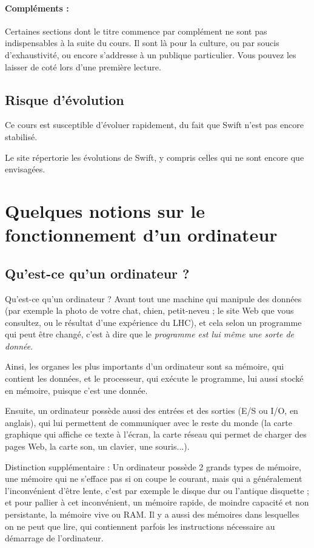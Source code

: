 \paragraph{Compléments :}
Certaines sections dont le titre commence par complément
ne sont pas indispensables à la suite du cours.
Il sont là pour la culture, ou par soucis d'exhaustivité,
ou encore s'addresse à un publique particulier.
Vous pouvez les laisser de coté lors d'une première lecture.
\subsection{Risque d’évolution}
Ce cours est susceptible d'évoluer rapidement,
du fait que Swift n'est pas encore stabilisé.

Le site
répertorie les évolutions de Swift,
y compris celles qui ne sont encore que envisagées.
\section{Quelques notions sur le fonctionnement d'un ordinateur}
\subsection{Qu'est-ce qu'un ordinateur ?}
Qu'est-ce qu'un ordinateur ?
Avant tout une machine qui manipule des données
(par exemple la photo de votre chat, chien, petit-neveu ;
le site Web que vous consultez, ou le résultat d'une expérience du LHC),
et cela selon un programme qui peut être changé,
c'est à dire que le \emph{programme est lui même une sorte de donnée}.

Ainsi, les organes les plus importants d'un ordinateur sont
sa mémoire, qui contient les données, et le processeur,
qui exécute le programme, lui aussi stocké en mémoire, puisque c'est une donnée.

Ensuite, un ordinateur possède aussi des entrées et des sorties (E/S ou I/O, en anglais),
qui lui permettent de communiquer avec le reste du monde
(la carte graphique qui affiche ce texte à l'écran,
la carte réseau qui permet de charger des pages Web,
la carte son, un clavier, une souris...).

Distinction supplémentaire : Un ordinateur possède 2 grands types de mémoire,
une mémoire qui ne s'efface pas si on coupe le courant,
mais qui a généralement l'inconvénient d'être lente,
c'est par exemple le disque dur ou l'antique disquette ;
et pour pallier à cet inconvénient, un mémoire rapide,
de moindre capacité et non persistante, la mémoire vive ou RAM.
Il y a aussi des mémoires dans lesquelles on ne peut que lire, qui
contiennent parfois les instructions nécessaire au démarrage de l'ordinateur.
